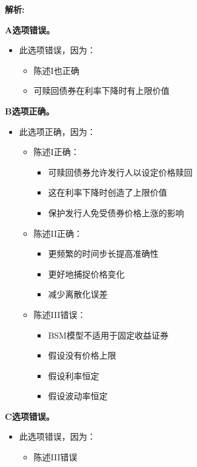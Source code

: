 \documentclass{article}
\newenvironment{explanation}
{\textbf{解析:}\par}
{\par}
\begin{document}
\begin{explanation}
    \textbf{A选项错误。}
    \begin{itemize}
        \item 此选项错误，因为：
        \begin{itemize}
            \item 陈述I也正确
            \item 可赎回债券在利率下降时有上限价值
        \end{itemize}
    \end{itemize}
    \textbf{B选项正确。}
    \begin{itemize}
        \item 此选项正确，因为：
        \begin{itemize}
            \item 陈述I正确：
            \begin{itemize}
                \item 可赎回债券允许发行人以设定价格赎回
                \item 这在利率下降时创造了上限价值
                \item 保护发行人免受债券价格上涨的影响
            \end{itemize}
            \item 陈述II正确：
            \begin{itemize}
                \item 更频繁的时间步长提高准确性
                \item 更好地捕捉价格变化
                \item 减少离散化误差
            \end{itemize}
            \item 陈述III错误：
            \begin{itemize}
                \item BSM模型不适用于固定收益证券
                \item 假设没有价格上限
                \item 假设利率恒定
                \item 假设波动率恒定
            \end{itemize}
        \end{itemize}
    \end{itemize}
    \textbf{C选项错误。}
    \begin{itemize}
        \item 此选项错误，因为：
        \begin{itemize}
            \item 陈述III错误

\end{itemize}
\end{itemize}
\end{explanation}
\end{document}

